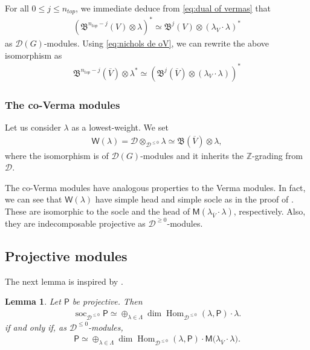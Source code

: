 \documentclass[reqno]{amsart}
\newcommand{\oV}{\overline{V}}
\renewcommand{\_}[1]{_{\left( #1 \right)}}
\renewcommand{\^}[1]{^{\left( #1 \right)}}
\newcommand{\ot}{{\otimes}}
\newcommand\fM{\mathsf{M}}
\newcommand\fP{\mathsf{P}}
\newcommand\fW{\mathsf{W}}
\newcommand{\Z}{{\mathbb Z}}
\newcommand{\D}{\mathcal{D}}
\newcommand{\BV}{{\mathfrak B}}
\newcommand\Hom{\operatorname{Hom}}
\newcommand\soc{\operatorname{soc}_{\D^{\leq0}}}
\theoremstyle{plain}
\newtheorem{lema}{Lemma}[section]
\theoremstyle{definition}
\theoremstyle{remark}
\begin{document}
For all $0\leq j\leq n_{top}$, we immediate deduce from \eqref{eq:dual of vermas} that
\begin{align}\label{eq:dual of vermas por grado}
(\BV^{n_{top}-j}(V)\ot\lambda)^*\simeq\BV^{j}(V)\ot(\lambda_V\cdot\lambda)^*
\end{align}
as $\D(G)$-modules. Using \eqref{eq:nichols de oV}, we can rewrite the above isomorphism as
\begin{align}\label{eq:dual of covermas por grado}
\BV^{n_{top}-j}(\oV)\ot\lambda^*\simeq\left(\BV^{j}(\oV)\ot(\lambda_V\cdot\lambda)\right)^*
\end{align}


\subsubsection{The co-Verma modules}%
Let us consider $\lambda$ as a lowest-weight. We set 
\begin{align}\label{def:coVerma}
\fW(\lambda)=\D\ot_{\D^{\leq0}}\lambda\simeq\BV(\oV)\ot\lambda,
\end{align}
where the isomorphism is of $\D(G)$-modules and it inherits the $\Z$-grading from $\D$.

The co-Verma modules have analogous properties to the Verma modules. In fact, we can see that $\fW(\lambda)$ have simple head and simple socle as in the proof of \cite[Theorem 3 and 4]{PV2}. These are isomorphic to the socle and the head of $\fM(\lambda_{\oV}\cdot\lambda)$, respectively. Also, they are indecomposable projective as $\D^{\geq0}$-modules.


\subsection{Projective modules}\label{subsec:projective modules}
The next lemma is inspired by \cite[Lemma 2.4]{MR1435369}.

\begin{lema}\label{lema:projective decompose into verma}
Let $\fP$ be projective. Then 
\begin{align*}
\soc\fP\simeq\oplus_{\lambda\in\Lambda}\dim\Hom_{\D^{\leq0}}(\lambda,\fP)\cdot \lambda.
\end{align*}
if and only if, as $\D^{\leq0}$-modules,
\begin{align*}
\fP\simeq\oplus_{\lambda\in\Lambda}\dim\Hom_{\D^{\leq0}}(\lambda,\fP)\cdot \fM\bigl(\lambda_{\oV}\cdot\lambda\bigr).
\end{align*}
\end{lema}
\end{document}
